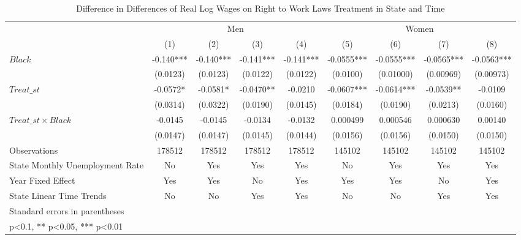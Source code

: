 \begin{table}[htbp]\centering
\def\sym#1{\ifmmode^{#1}\else\(^{#1}\)\fi}
\caption{Difference in Differences of Real Log Wages on Right to Work Laws Treatment in State and Time}
\begin{tabular}{l*{8}{c}}
\hline\hline
                    &\multicolumn{4}{c}{Men}                                        &\multicolumn{4}{c}{Women}                                      \\\cmidrule(lr){2-5}\cmidrule(lr){6-9}
                    &\multicolumn{1}{c}{(1)}   &\multicolumn{1}{c}{(2)}   &\multicolumn{1}{c}{(3)}   &\multicolumn{1}{c}{(4)}   &\multicolumn{1}{c}{(5)}   &\multicolumn{1}{c}{(6)}   &\multicolumn{1}{c}{(7)}   &\multicolumn{1}{c}{(8)}   \\
\hline
$ Black $           &      -0.140***&      -0.140***&      -0.141***&      -0.141***&     -0.0555***&     -0.0555***&     -0.0565***&     -0.0563***\\
                    &    (0.0123)   &    (0.0123)   &    (0.0122)   &    (0.0122)   &    (0.0100)   &   (0.01000)   &   (0.00969)   &   (0.00973)   \\
[1em]
$ Treat\_{st} $      &     -0.0572*  &     -0.0581*  &     -0.0470** &     -0.0210   &     -0.0607***&     -0.0614***&     -0.0539** &     -0.0109   \\
                    &    (0.0314)   &    (0.0322)   &    (0.0190)   &    (0.0145)   &    (0.0184)   &    (0.0190)   &    (0.0213)   &    (0.0160)   \\
[1em]
$ Treat\_{st} \times Black $&     -0.0145   &     -0.0145   &     -0.0134   &     -0.0132   &    0.000499   &    0.000546   &    0.000630   &     0.00140   \\
                    &    (0.0147)   &    (0.0147)   &    (0.0145)   &    (0.0144)   &    (0.0156)   &    (0.0156)   &    (0.0150)   &    (0.0150)   \\
\hline
Observations        &      178512   &      178512   &      178512   &      178512   &      145102   &      145102   &      145102   &      145102   \\
State Monthly Unemployment Rate&          No   &         Yes   &         Yes   &         Yes   &          No   &         Yes   &         Yes   &         Yes   \\
Year Fixed Effect   &         Yes   &         Yes   &          No   &         Yes   &         Yes   &         Yes   &          No   &         Yes   \\
State Linear Time Trends&          No   &          No   &         Yes   &         Yes   &          No   &          No   &         Yes   &         Yes   \\
\hline\hline
\multicolumn{9}{l}{\footnotesize Standard errors in parentheses}\\
\multicolumn{9}{l}{\footnotesize * p<0.1, ** p<0.05, *** p<0.01}\\
\end{tabular}
\end{table}
